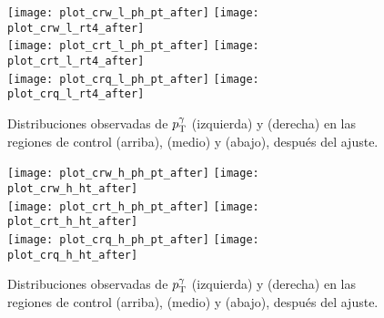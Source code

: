 




\begin{figure}[!htb]
  \centering

  \texttt{[image: plot\_crw\_l\_ph\_pt\_after]}
  \texttt{[image: plot\_crw\_l\_rt4\_after]} \\

  \texttt{[image: plot\_crt\_l\_ph\_pt\_after]}
  \texttt{[image: plot\_crt\_l\_rt4\_after]} \\

  \texttt{[image: plot\_crq\_l\_ph\_pt\_after]}
  \texttt{[image: plot\_crq\_l\_rt4\_after]} \\

   \caption{Distribuciones observadas de $p_{\mathrm{T}}^\gamma$ (izquierda) y {\rt} (derecha) en las
     regiones de control {\CRWL} (arriba), {\CRTL} (medio) y {\CRQL} (abajo),
     después del ajuste.}
   \label{fig:bkgfit_crl_after}

\end{figure}


\begin{figure}[!htb]
  \centering

  \texttt{[image: plot\_crw\_h\_ph\_pt\_after]}
  \texttt{[image: plot\_crw\_h\_ht\_after]} \\

  \texttt{[image: plot\_crt\_h\_ph\_pt\_after]}
  \texttt{[image: plot\_crt\_h\_ht\_after]} \\

  \texttt{[image: plot\_crq\_h\_ph\_pt\_after]}
  \texttt{[image: plot\_crq\_h\_ht\_after]} \\

  \caption{Distribuciones observadas de $p_{\mathrm{T}}^\gamma$ (izquierda) y {\HT} (derecha) en las
    regiones de control {\CRWH} (arriba), {\CRTH} (medio) y {\CRQH} (abajo),
    después del ajuste.}
  \label{fig:bkgfit_crh_after}

\end{figure}





